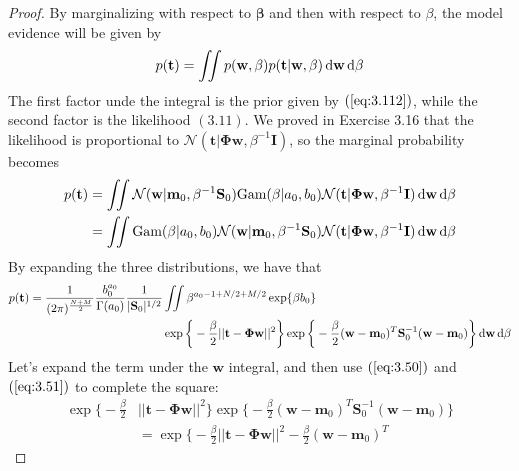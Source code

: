 \begin{proof}
    By marginalizing with respect to $\mathbf{\beta}$ and then
    with respect to $\beta$, the model evidence will be given by
     \[
         p(\mathbf{t}) 
         = \iint p(\mathbf{w}, \beta) p(\mathbf{t} | \mathbf{w}, \beta) \mathop{}\!\mathrm{d} \mathbf{w} 
         \mathop{}\!\mathrm{d}\beta
    \] 
    The first factor unde the integral is the prior given by $(\ref{eq:3.112})$,
    while the second factor is the likelihood $(3.11)$. We proved
    in Exercise 3.16 that the likelihood is proportional to 
    $\mathcal{N}(\mathbf{t} | \mathbf{\Phi}\mathbf{w}, \beta^{-1}\mathbf{I})$,
    so the marginal probability becomes
    \begin{align*}
         p(\mathbf{t}) 
         &= \iint \mathcal{N}(\mathbf{w} | \mathbf{m}_0, \beta^{-1}\mathbf{S}_0)
            \text{Gam}(\beta | a_0, b_0) 
            \mathcal{N}(\mathbf{t} | \mathbf{\Phi}\mathbf{w}, \beta^{-1}\mathbf{I}) 
            \mathop{}\!\mathrm{d} \mathbf{w}\mathop{}\!\mathrm{d}\beta \\
         &= \iint \text{Gam}(\beta | a_0, b_0)
            \mathcal{N}(\mathbf{w} | \mathbf{m}_0, \beta^{-1}\mathbf{S}_0)
            \mathcal{N}(\mathbf{t} | \mathbf{\Phi}\mathbf{w}, 
                \beta^{-1}\mathbf{I}) \mathop{}\!\mathrm{d} \mathbf{w}
            \mathop{}\!\mathrm{d} \beta
    \end{align*}
    By expanding the three distributions, we have that
    \begin{align*}
        p(\mathbf{t}) = \frac{1}{(2\pi)^{\frac{N + M}{2}}}\frac{b_0^{a_0}}{\Gamma(a_0)}
         \frac{1}{|\mathbf{S}_0|^{1/2}} 
        &\iint \beta^{a_0 - 1 + N/2 + M/2} \exp\{\beta b_0\} \\
        &\exp\bigg\{-\frac{\beta}{2} ||\mathbf{t} - \mathbf{\Phi}\mathbf{w}||^2\bigg\}
         \exp\bigg\{-\frac{\beta}{2}(\mathbf{w} - \mathbf{m}_0)^T
             \mathbf{S}_0^{-1}(\mathbf{w} - \mathbf{m}_0)
         \bigg\} \mathop{}\!\mathrm{d} \mathbf{w} \mathop{}\!\mathrm{d} \beta
    \end{align*}
    Let's expand the term under the $\mathbf{w}$ integral, and then use $(\ref{eq:3.50})$ and
    $(\ref{eq:3.51})$ to complete the square:
    \begin{align*}
        \exp\bigg\{-\frac{\beta}{2} &||\mathbf{t} - \mathbf{\Phi}\mathbf{w}||^2\bigg\}
        \exp\bigg\{-\frac{\beta}{2}(\mathbf{w} - \mathbf{m}_0)^T
             \mathbf{S}_0^{-1}(\mathbf{w} - \mathbf{m}_0)
         \bigg\} \\
        &=\exp\bigg\{-\frac{\beta}{2} ||\mathbf{t} - \mathbf{\Phi}\mathbf{w}||^2
        -\frac{\beta}{2}(\mathbf{w} - \mathbf{m}_0)^T

\end{align*}
\end{proof}
